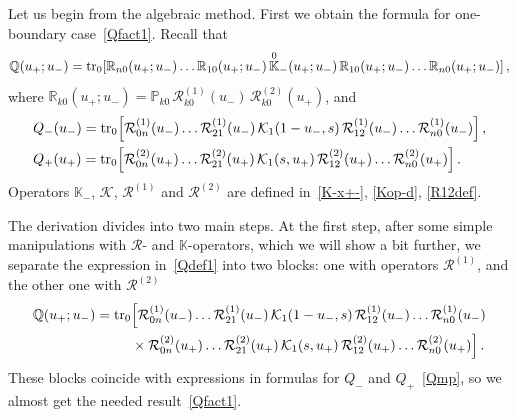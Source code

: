 \documentclass[a4paper,11pt]{article}
\newcommand{\tr}{\mathop{\rm tr}\nolimits}
\numberwithin{equation}{section}
\begin{document}
Let us begin from the algebraic method. First we obtain the formula for one-boundary case~\eqref{Qfact1}. Recall that
\begin{equation} \label{Qdef1}
	\mathbb{Q}(u_+;u_-) = \tr_0[\mathbb{R}_{n0}(u_+;u_-)\dots\mathbb{R}_{10}(u_+;u_-)\,\overset{0}{\mathbb{K}}_-(u_+;u_-)\,\mathbb{R}_{10}(u_+;u_-)\dots\mathbb{R}_{n0}(u_+;u_-)] \,,
\end{equation}
where $\mathbb{R}_{k0}(u_+;u_-) = \mathbb{P}_{k0}\,\mathcal{R}^{(1)}_{k0}(u_-)\, \mathcal{R}^{(2)}_{k0}(u_+)$, and
\begin{equation} \label{Qmp}
	\begin{aligned}
		&
		Q_-(u_-)= \tr_{0}\Bigl[\mathcal{R}^{(1)}_{0n}(u_-)\ldots\mathcal{R}^{(1)}_{21}(u_-)\,\mathcal{K}_1(1-u_-,s)\,\mathcal{R}^{(1)}_{12}(u_-)\ldots\mathcal{R}^{(1)}_{n0}(u_-)\Bigr] \,, \\
		&
		Q_+(u_+)= \tr_{0}\Bigl[\mathcal{R}^{(2)}_{0n}(u_+)\ldots\mathcal{R}^{(2)}_{21}(u_+)\,\mathcal{K}_1(s,u_+)\,\mathcal{R}^{(2)}_{12}(u_+)\ldots\mathcal{R}^{(2)}_{n0}(u_+)\Bigr] \,.
	\end{aligned}
\end{equation}
Operators $\mathbb{K}_-$, $\mathcal{K}$, $\mathcal{R}^{(1)}$ and $\mathcal{R}^{(2)}$ are defined in~\eqref{K-x+-}, \eqref{Kop-d}, \eqref{R12def}.

The derivation divides into two main steps.
At the first step, after some simple manipulations with $\mathcal{R}$- and $\mathbb{K}$-operators, which we will show a bit further, we separate the expression in~\eqref{Qdef1} into two blocks: one with operators $\mathcal{R}^{(1)}$, and the other one with $\mathcal{R}^{(2)}$
\begin{align}
	\nonumber
	\mathbb{Q}(u_+;u_-) =  \tr_0 &\Bigl[\mathcal{R}^{(1)}_{0n}(u_-)\ldots\mathcal{R}^{(1)}_{21}(u_-)\,\mathcal{K}_1(1-u_-,s)\,\mathcal{R}^{(1)}_{12}(u_-)\ldots\mathcal{R}^{(1)}_{n0}(u_-) \\
	& \label{Q1}
	\times\mathcal{R}^{(2)}_{0n}(u_+)\ldots\mathcal{R}^{(2)}_{21}(u_+)\,\mathcal{K}_1(s,u_+)\,\mathcal{R}^{(2)}_{12}(u_+)\ldots\mathcal{R}^{(2)}_{n0}(u_+)\Bigr] \,.
\end{align}
These blocks coincide with expressions in formulas for $Q_-$ and $Q_+$~\eqref{Qmp}, so we almost get the needed result~\eqref{Qfact1}.
\end{document}
